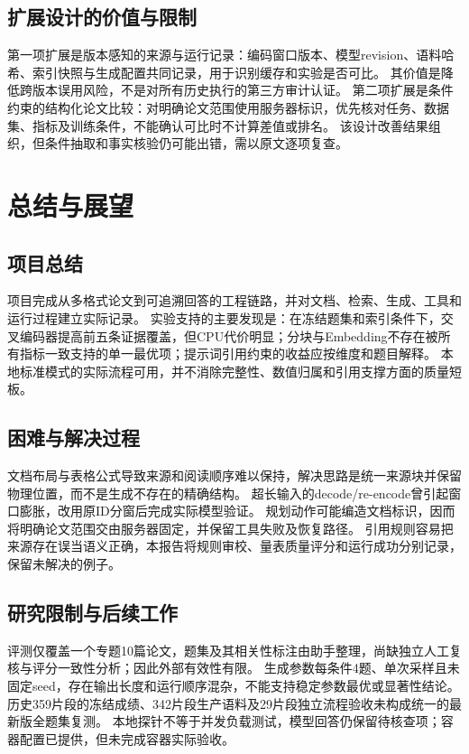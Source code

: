 \documentclass[UTF8,a4paper,zihao=-4,fontset=fandol]{ctexart}
\begin{document}
\subsection{扩展设计的价值与限制}
第一项扩展是版本感知的来源与运行记录：编码窗口版本、模型revision、语料哈希、索引快照与生成配置共同记录，用于识别缓存和实验是否可比。
其价值是降低跨版本误用风险，不是对所有历史执行的第三方审计认证。
第二项扩展是条件约束的结构化论文比较：对明确论文范围使用服务器标识，优先核对任务、数据集、指标及训练条件，不能确认可比时不计算差值或排名。
该设计改善结果组织，但条件抽取和事实核验仍可能出错，需以原文逐项复查。

\section{总结与展望}
\subsection{项目总结}
项目完成从多格式论文到可追溯回答的工程链路，并对文档、检索、生成、工具和运行过程建立实际记录。
实验支持的主要发现是：在冻结题集和索引条件下，交叉编码器提高前五条证据覆盖，但CPU代价明显；分块与Embedding不存在被所有指标一致支持的单一最优项；提示词引用约束的收益应按维度和题目解释。
本地标准模式的实际流程可用，并不消除完整性、数值归属和引用支撑方面的质量短板。

\subsection{困难与解决过程}
文档布局与表格公式导致来源和阅读顺序难以保持，解决思路是统一来源块并保留物理位置，而不是生成不存在的精确结构。
超长输入的decode/re-encode曾引起窗口膨胀，改用原ID分窗后完成实际模型验证。
规划动作可能编造文档标识，因而将明确论文范围交由服务器固定，并保留工具失败及恢复路径。
引用规则容易把来源存在误当语义正确，本报告将规则审校、量表质量评分和运行成功分别记录，保留未解决的例子。

\subsection{研究限制与后续工作}
评测仅覆盖一个专题10篇论文，题集及其相关性标注由助手整理，尚缺独立人工复核与评分一致性分析；因此外部有效性有限。
生成参数每条件4题、单次采样且未固定seed，存在输出长度和运行顺序混杂，不能支持稳定参数最优或显著性结论。
历史359片段的冻结成绩、342片段生产语料及29片段独立流程验收未构成统一的最新版全题集复测。
本地探针不等于并发负载测试，模型回答仍保留待核查项；容器配置已提供，但未完成容器实际验收。
\end{document}
